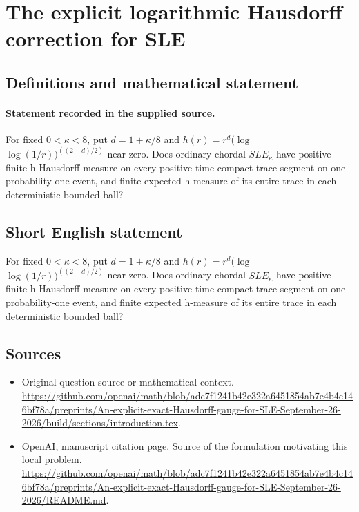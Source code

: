 \documentclass[11pt]{article}
\begin{document}
\section*{The explicit logarithmic Hausdorff correction for SLE}\label{30007397}
\subsection{Definitions and mathematical statement}
\paragraph{Statement recorded in the supplied source.}
For fixed $0<\kappa <8$, put $d=1+\kappa /8$ and $h(r)=r^d(\log $ $\log (1/r))^((2-d)/2)$ near zero. Does ordinary chordal $SLE_\kappa $ have positive finite h-Hausdorff measure on every positive-time compact trace segment on one probability-one event, and finite expected h-measure of its entire trace in each deterministic bounded ball?
\subsection{Short English statement}
For fixed $0<\kappa <8$, put $d=1+\kappa /8$ and $h(r)=r^d(\log $ $\log (1/r))^((2-d)/2)$ near zero. Does ordinary chordal $SLE_\kappa $ have positive finite h-Hausdorff measure on every positive-time compact trace segment on one probability-one event, and finite expected h-measure of its entire trace in each deterministic bounded ball?
\subsection{Sources}
\begin{itemize}
\item[S1] Original question source or mathematical context.
\url{https://github.com/openai/math/blob/adc7f1241b42e322a6451854ab7e4b4c146bf78a/preprints/An-explicit-exact-Hausdorff-gauge-for-SLE-September-26-2026/build/sections/introduction.tex}.
\item[S2] OpenAI, manuscript citation page. Source of the formulation motivating this local problem.
\url{https://github.com/openai/math/blob/adc7f1241b42e322a6451854ab7e4b4c146bf78a/preprints/An-explicit-exact-Hausdorff-gauge-for-SLE-September-26-2026/README.md}.
\end{itemize}
\end{document}
